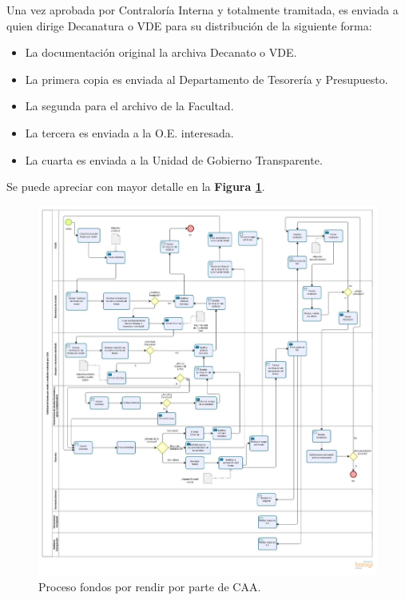 \begin{tasks}[counter-format = {tsk[A].}]
    Una vez aprobada por Contraloría Interna y totalmente tramitada, es enviada a quien dirige Decanatura o VDE para su distribución de la siguiente forma: 
    \begin{itemize}
        \item La documentación original la archiva Decanato o VDE.
        \item La primera copia es enviada al Departamento de Tesorería y Presupuesto.
        \item La segunda para el archivo de la Facultad.
        \item La tercera es enviada a la O.E. interesada.
        \item La cuarta es enviada a la Unidad de Gobierno Transparente.

    \end{itemize}

    Se puede apreciar con mayor detalle en la \textbf{Figura \ref{fig: Solicitud_CAA}}.

\end{tasks}

\begin{figure}[p!]
    \includegraphics[width=\textwidth]{Imagenes/Solicitud_CCAA.jpg}
    \caption{\label{fig: Solicitud_CAA}Proceso fondos por rendir por parte de CAA.}
\end{figure}

